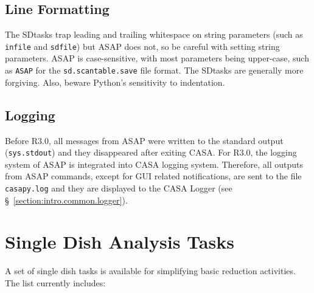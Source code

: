 \subsection{Line Formatting}
\label{section:sd.intro.line}

The SDtasks trap leading and trailing whitespace on string parameters
(such as {\tt infile} and {\tt sdfile}) but ASAP does not, so be
careful with setting string parameters.  ASAP is case-sensitive,
with most parameters being upper-case, such as {\tt ASAP} for the
{\tt sd.scantable.save} file format.  The SDtasks are generally
more forgiving.  Also, beware Python's sensitivity to indentation.

\subsection{Logging}
\label{section:sd.intro.log}

Before R3.0, all messages from ASAP were written to the standard output
({\tt sys.stdout}) and they disappeared after exiting CASA. For R3.0, the
logging system of ASAP is integrated into CASA logging system.  Therefore, all outputs from ASAP commands, except for GUI related notifications, are sent to the file {\tt casapy.log} and they
are displayed to the CASA Logger (see \S~\ref{section:intro.common.logger}).

\section{Single Dish Analysis Tasks}
\label{section:sd.sdtasks}

A set of single dish tasks is available for simplifying basic
reduction activities.  The list currently includes:


